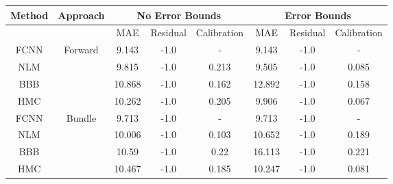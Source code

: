 \documentclass[convert={outext=.png}]{standalone}
\begin{document}
\centering
\label{tab:experimental_results}

\begin{tabular}{c c c c c c c c}

\hline
\hline
Method & Approach &  \multicolumn{3}{c}{No Error Bounds} & \multicolumn{3}{c}{Error Bounds} \\ \hline
 && MAE & Residual & Calibration & MAE & Residual & Calibration\\
 FCNN & \multirow{4}{*}{Forward} & 9.143 & -1.0 & - & 9.143 & -1.0 & - \\
 NLM &  & 9.815 & -1.0 & 0.213 & 9.505 & -1.0 & 0.085 \\
 BBB &  & 10.868 & -1.0 & 0.162 & 12.892 & -1.0 & 0.158 \\
 HMC &  & 10.262 & -1.0 & 0.205 & 9.906 & -1.0 & 0.067 \\
 \hline
 FCNN & \multirow{4}{*}{Bundle} & 9.713 & -1.0 & - & 9.713 & -1.0 & - \\
 NLM &  & 10.006 & -1.0 & 0.103 & 10.652 & -1.0 & 0.189 \\
 BBB &  & 10.59 & -1.0 & 0.22 & 16.113 & -1.0 & 0.221 \\
 HMC &  & 10.467 & -1.0 & 0.185 & 10.247 & -1.0 & 0.081 \\
\hline
\hline
\end{tabular}
\end{document}
